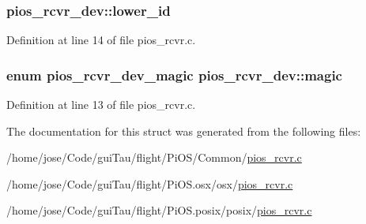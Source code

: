\hypertarget{structpios__rcvr__dev_ae6499b31e342e883508673e1503ef9f8}{
\subsubsection[{lower\-\_\-id}]{ pios\-\_\-rcvr\-\_\-dev\-::lower\-\_\-id}}\label{structpios__rcvr__dev_ae6499b31e342e883508673e1503ef9f8}


Definition at line 14 of file pios\-\_\-rcvr.\-c.

\hypertarget{structpios__rcvr__dev_aa167293d3d19f1030cc61a2fc386eb66}{
\subsubsection[{magic}]{\setlength{\rightskip}{0pt plus 5cm}enum {\bf pios\-\_\-rcvr\-\_\-dev\-\_\-magic} pios\-\_\-rcvr\-\_\-dev\-::magic}}\label{structpios__rcvr__dev_aa167293d3d19f1030cc61a2fc386eb66}


Definition at line 13 of file pios\-\_\-rcvr.\-c.



The documentation for this struct was generated from the following files\-:\begin{DoxyCompactItemize}
\item 
/home/jose/\-Code/gui\-Tau/flight/\-Pi\-O\-S/\-Common/\hyperlink{_common_2pios__rcvr_8c}{pios\-\_\-rcvr.\-c}\item 
/home/jose/\-Code/gui\-Tau/flight/\-Pi\-O\-S.\-osx/osx/\hyperlink{osx_2osx_2pios__rcvr_8c}{pios\-\_\-rcvr.\-c}\item 
/home/jose/\-Code/gui\-Tau/flight/\-Pi\-O\-S.\-posix/posix/\hyperlink{posix_2posix_2pios__rcvr_8c}{pios\-\_\-rcvr.\-c}\end{DoxyCompactItemize}
